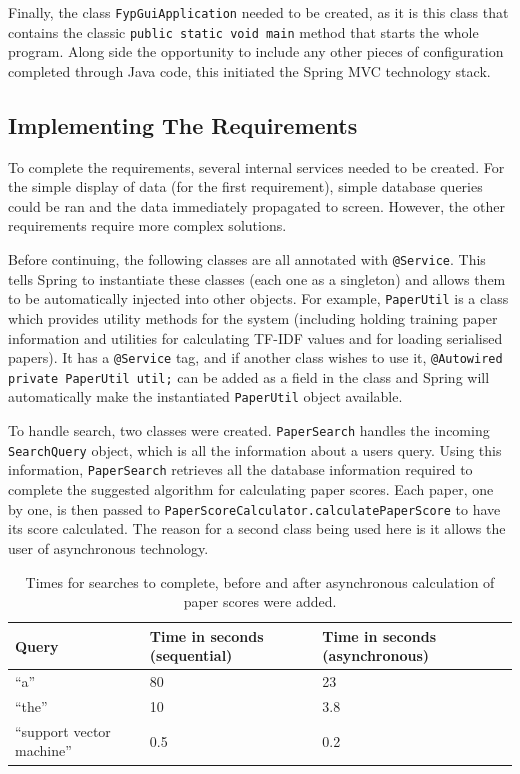 Finally, the class \texttt{FypGuiApplication} needed to be created, as it is this class that contains the classic \texttt{public static void main} method that starts the whole program. Along side the opportunity to include any other pieces of configuration completed through Java code, this initiated the Spring MVC technology stack.

\subsection*{Implementing The Requirements}
To complete the requirements, several internal services needed to be created. For the simple display of data (for the first requirement), simple database queries could be ran and the data immediately propagated to screen. However, the other requirements require more complex solutions. 

Before continuing, the following classes are all annotated with \texttt{@Service}. This tells Spring to instantiate these classes (each one as a singleton) and allows them to be automatically injected into other objects. For example, \texttt{PaperUtil} is a class which provides utility methods for the system (including holding training paper information and utilities for calculating TF-IDF values and for loading serialised papers). It has a \texttt{@Service} tag, and if another class wishes to use it, \texttt{@Autowired private PaperUtil util;} can be added as a field in the class and Spring will automatically make the instantiated \texttt{PaperUtil} object available.

To handle search, two classes were created. \texttt{PaperSearch} handles the incoming \texttt{SearchQuery} object, which is all the information about a users query. Using this information, \texttt{PaperSearch} retrieves all the database information required to complete the suggested algorithm for calculating paper scores. Each paper, one by one, is then passed to \texttt{PaperScoreCalculator.calculatePaperScore} to have its score calculated. The reason for a second class being used here is it allows the user of asynchronous technology.

\begin{table}
	\centering
	\begin{tabular}{ C{4.5cm} | C{4.5cm} | C{4.5cm} }
		\textbf{Query} & \textbf{Time in seconds (sequential)} & \textbf{Time in seconds (asynchronous)} \\
		\hline
		``a'' & 80 & 23 \\
		``the'' & 10 & 3.8 \\
		``support vector machine'' & 0.5 & 0.2 \\
	\end{tabular}
	\caption[Search Times with and without parallel execution]{Times for searches to complete, before and after asynchronous calculation of paper scores were added.}
	\label{table:searchtimesasync}
\end{table}

